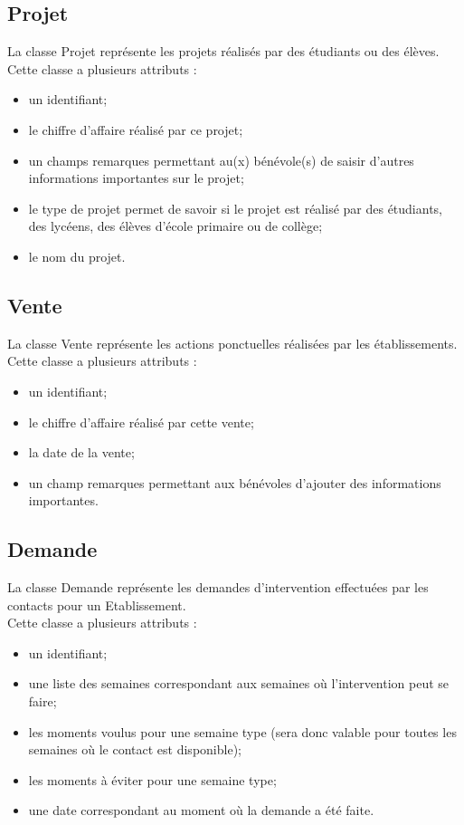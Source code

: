 \documentclass[asi, sansVersion]{picInsa}
\begin{document}
\subsection*{Projet}
La classe Projet représente les projets réalisés par des étudiants ou des élèves.\\
Cette classe a plusieurs attributs : 
\begin{itemize}
\item un identifiant;
\item le chiffre d'affaire réalisé par ce projet;
\item un champs remarques permettant au(x) bénévole(s) de saisir d'autres informations importantes sur le projet;
\item le type de projet permet de savoir si le projet est réalisé par des étudiants, des lycéens, des élèves d'école primaire ou de collège;
\item le nom du projet.
\end{itemize}

\subsection*{Vente}
La classe Vente représente les actions ponctuelles réalisées par les établissements.\\ 
Cette classe a plusieurs attributs : 
\begin{itemize}
\item un identifiant; 
\item le chiffre d'affaire réalisé par cette vente;
\item la date de la vente;
\item un champ remarques permettant aux bénévoles d'ajouter des informations importantes. 
\end{itemize}

\subsection*{Demande}

La classe Demande représente les demandes d'intervention effectuées par les contacts pour un Etablissement.\\
Cette classe a plusieurs attributs :
\begin{itemize}
\item un identifiant;
\item une liste des semaines correspondant aux semaines où l'intervention peut se faire; 
\item les moments voulus pour une semaine type (sera donc valable pour toutes les semaines où le contact est disponible);
\item les moments à éviter pour une semaine type;
\item une date correspondant au moment où la demande a été faite.
\end{itemize}
\end{document}
